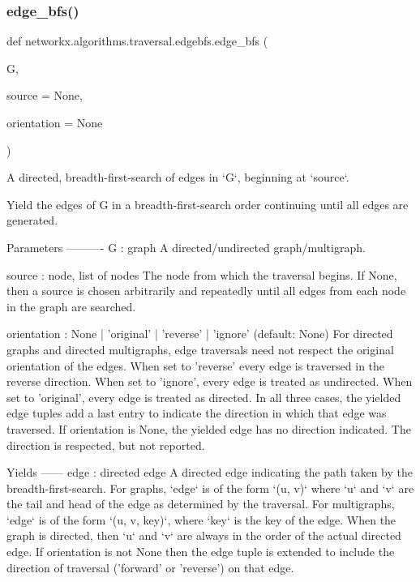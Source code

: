 \subsubsection{\texorpdfstring{edge\+\_\+bfs()}{edge\_bfs()}}
{\footnotesize\ttfamily def networkx.\+algorithms.\+traversal.\+edgebfs.\+edge\+\_\+bfs (\begin{DoxyParamCaption}\item[{}]{G,  }\item[{}]{source = {\ttfamily None},  }\item[{}]{orientation = {\ttfamily None} }\end{DoxyParamCaption})}

\begin{DoxyVerb}A directed, breadth-first-search of edges in `G`, beginning at `source`.

Yield the edges of G in a breadth-first-search order continuing until
all edges are generated.

Parameters
----------
G : graph
    A directed/undirected graph/multigraph.

source : node, list of nodes
    The node from which the traversal begins. If None, then a source
    is chosen arbitrarily and repeatedly until all edges from each node in
    the graph are searched.

orientation : None | 'original' | 'reverse' | 'ignore' (default: None)
    For directed graphs and directed multigraphs, edge traversals need not
    respect the original orientation of the edges.
    When set to 'reverse' every edge is traversed in the reverse direction.
    When set to 'ignore', every edge is treated as undirected.
    When set to 'original', every edge is treated as directed.
    In all three cases, the yielded edge tuples add a last entry to
    indicate the direction in which that edge was traversed.
    If orientation is None, the yielded edge has no direction indicated.
    The direction is respected, but not reported.

Yields
------
edge : directed edge
    A directed edge indicating the path taken by the breadth-first-search.
    For graphs, `edge` is of the form `(u, v)` where `u` and `v`
    are the tail and head of the edge as determined by the traversal.
    For multigraphs, `edge` is of the form `(u, v, key)`, where `key` is
    the key of the edge. When the graph is directed, then `u` and `v`
    are always in the order of the actual directed edge.
    If orientation is not None then the edge tuple is extended to include
    the direction of traversal ('forward' or 'reverse') on that edge.


\end{DoxyVerb}
